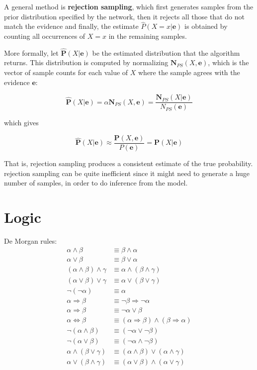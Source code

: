 \documentclass{article}
\begin{document}
A general method is \textbf{rejection sampling}, which first generates samples from the prior distribution specified by the network, then it rejects all those that do not match the evidence and finally, the estimate $\hat{P}(X=x|\textbf{e})$ is obtained by counting all occurrences of $X=x$ in the remaining samples. 

More formally, let $\hat{\textbf{P}}(X|\textbf{e})$ be the estimated distribution that the algorithm returns. This distribution is computed by normalizing $\textbf{N}_{PS}(X,\textbf{e})$, which is the vector of sample counts for each value of $X$ where the sample agrees with the evidence $\textbf{e}$:

$$\hat{\textbf{P}}(X|\textbf{e})=\alpha\textbf{N}_{PS}(X,\textbf{e})=\frac{\textbf{N}_{PS}(X|\textbf{e})}{N_{PS}(\textbf{e})}$$

which gives

$$\hat{\textbf{P}}(X|\textbf{e})\approx\frac{\textbf{P}(X, \textbf{e})}{P(\textbf{e})}=\textbf{P}(X|\textbf{e})$$

That is, rejection sampling produces a consistent estimate of the true probability. rejection sampling can be quite inefficient since it might need to generate a huge number of samples, in order to do inference from the model.

\clearpage
\appendix
\section{Logic}\label{appendix:Logic}
De Morgan rules:
\begin{align*}
    \alpha \land \beta &\equiv \beta \land \alpha \\
    \alpha \lor \beta &\equiv \beta \lor \alpha \\
    (\alpha \land \beta)\land \gamma &\equiv \alpha \land (\beta \land \gamma) \\
    (\alpha \lor \beta)\lor \gamma &\equiv \alpha \lor (\beta \lor \gamma) \\
    \neg (\neg \alpha) &\equiv \alpha \\
    \alpha \Rightarrow \beta &\equiv \neg \beta \Rightarrow \neg \alpha \\
    \alpha \Rightarrow \beta &\equiv \neg \alpha \lor \beta \\
    \alpha\Leftrightarrow\beta &\equiv (\alpha\Rightarrow\beta) \land (\beta\Rightarrow\alpha) \\
    \neg (\alpha \land \beta) &\equiv (\neg \alpha \lor \neg \beta) \\
    \neg (\alpha \lor \beta) &\equiv (\neg \alpha \land \neg \beta) \\
    \alpha \land (\beta \lor \gamma) &\equiv (\alpha\land\beta)\lor(\alpha\land\gamma) \\
    \alpha \lor (\beta \land \gamma) &\equiv (\alpha \lor \beta)\land(\alpha \lor \gamma)
\end{align*}
\end{document}
